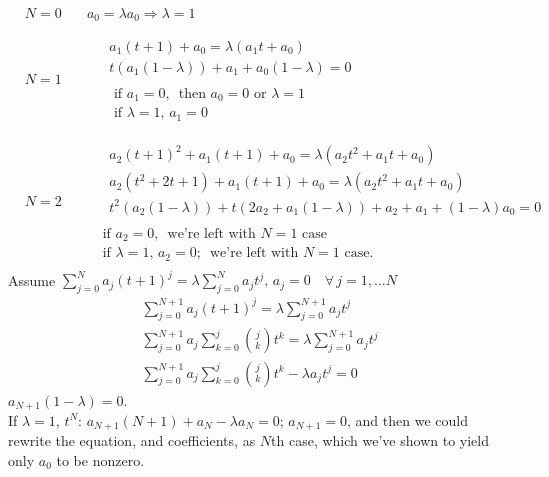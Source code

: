 \documentclass[twoside]{amsart}
\theoremstyle{plain}
\theoremstyle{definition}
\begin{document}
\[
\begin{aligned}
  & N =0 \quad & a_0 = \lambda a_0  \Longrightarrow \lambda =1 \\
  & \quad \\
  & N =1 \quad & \begin{gathered} 
    \begin{aligned} 
      & a_1 (t+1) + a_0 = \lambda (a_1 t + a_0 ) \\
      & t (a_1 (1-\lambda)) + a_1 + a_0 (1-\lambda) = 0 
\end{aligned} \\
    \begin{aligned} & \text{ if } a_1 = 0, \, \text{ then } a_0  =0 \text{ or } \lambda = 1 \\
      & \text{ if } \lambda = 1, \, a_1 = 0 
\end{aligned}
\end{gathered} \\ 
  & \quad \\
  & N = 2 \quad & \begin{gathered}
\begin{aligned} 
  & a_2 (t+1)^2 + a_1 (t+1) + a_0 = \lambda (a_2 t^2 + a_1 t + a_0 ) \\
  & a_2 (t^2 + 2t + 1) + a_1 (t+1) + a_0 = \lambda (a_2 t^2 + a_1 t + a_0 ) \\
  & t^2 (a_2 (1-\lambda)) + t (2a_2 + a_1(1-\lambda) ) +a_2 + a_1 + (1-\lambda)a_0 = 0 
\end{aligned} \\
\begin{aligned}
  \text{ if } a_2 = 0, \, \text{ we're left with $N=1$ case } \\
  \text{ if } \lambda =1, \, a_2 = 0; \, \text{ we're left with $N=1$ case.}
\end{aligned}
\end{gathered}
\end{aligned}
\]
Assume $\sum_{j=0}^N a_j(t+1)^j = \lambda \sum_{j=0}^N a_j t^j, \, a_j =0 \quad \forall \, j = 1,\dots N$
\[
\begin{gathered}
  \sum_{j=0}^{N+1} a_j (t+1)^j = \lambda \sum_{j=0}^{N+1} a_j t^j \\
  \sum_{j=0}^{N+1} a_j \sum_{k=0}^j \binom{j}{k} t^k = \lambda \sum_{j=0}^{N+1} a_j t^j \\
  \sum_{j=0}^{N+1} a_j \sum_{k=0}^j \binom{j}{k} t^k - \lambda a_j t^j = 0 
\end{gathered}
\]
$a_{N+1}(1-\lambda) =0$.  \\
If $\lambda = 1$, $t^N: \, a_{N+1}(N+1) + a_N - \lambda a_N = 0$; \quad $a_{N+1} =0$, and then we could rewrite the equation, and coefficients, as $N$th case, which we've shown to yield only $a_0$ to be nonzero.  
\end{document}
